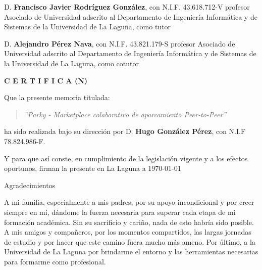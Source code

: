 \documentclass[a4paper,12pt,oneside]{scrbook}
\begin{document}
{
    \setlength\parindent{0pt}
    D. \textbf{Francisco Javier Rodríguez González}, con N.I.F. 43.618.712-V profesor Asociado de Universidad adscrito al Departamento de Ingeniería Informática y de Sistemas de la Universidad de La Laguna, como tutor

    \bigskip
    D. \textbf{Alejandro Pérez Nava}, con N.I.F. 43.821.179-S profesor Asociado de Universidad adscrito al Departamento de Ingeniería Informática y de Sistemas de la Universidad de La Laguna, como cotutor

    \bigskip
    \bigskip
    \textbf{C E R T I F I C A (N)}

    \bigskip
    Que la presente memoria titulada:

    \bigskip
    \begin{quote}
        \textit{``Parky - Marketplace colaborativo de aparcamiento Peer-to-Peer''}
    \end{quote}

    \bigskip
    \noindent ha sido realizada bajo su dirección por D. \textbf{Hugo González Pérez}, con N.I.F 78.824.986-F.

    \bigskip
    Y para que así conste, en cumplimiento de la legislación vigente y a los efectos
    oportunos, firman la presente en La Laguna a \today
}

\thispagestyle{empty}

\begin{flushright}
    \setlength{\parindent}{0mm}
    {\huge Agradecimientos}
    \vspace{15mm}

    \begin{large}
        \begin{minipage}{1\textwidth}
            A mi familia, especialmente a mis padres, por su apoyo incondicional y por creer siempre en mí, dándome la fuerza necesaria para superar cada etapa de mi formación académica. Sin su sacrificio y cariño, nada de esto habría sido posible. A mis amigos y compañeros, por los momentos compartidos, las largas jornadas de estudio y por hacer que este camino fuera mucho más ameno. Por último, a la Universidad de La Laguna por brindarme el entorno y las herramientas necesarias para formarme como profesional.
        \end{minipage}
    \end{large}
\end{flushright}
\end{document}
